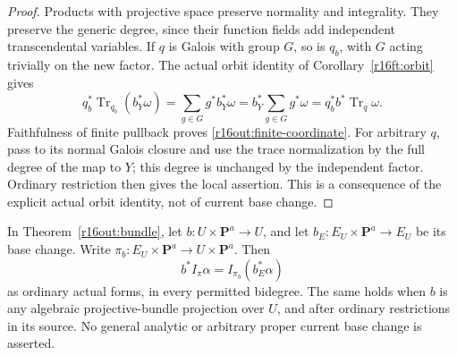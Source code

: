 \begin{proof}
Products with projective space preserve normality and integrality.
They preserve the generic degree, since their function fields add
independent transcendental variables.  If $q$ is Galois with group
$G$, so is $q_b$, with $G$ acting trivially on the new factor.
The actual orbit identity of Corollary~\ref{r16ft:orbit} gives
\[
 q_b^*\operatorname{Tr}_{q_b}(b_Y^*\omega)
  =\sum_{g\in G}g^*b_Y^*\omega
  =b_Y^*\sum_{g\in G}g^*\omega
  =q_b^*b^*\operatorname{Tr}_q\omega.
\]
Faithfulness of finite pullback proves \eqref{r16out:finite-coordinate}.
For arbitrary $q$, pass to its normal Galois closure and use the
trace normalization by the full degree of the map to $Y$; this
degree is unchanged by the independent factor.  Ordinary restriction
then gives the local assertion.  This is a consequence of the
explicit actual orbit identity, not of current base change.
\end{proof}

\begin{theorem}
\label{r16out:coordinate-base-change}
In Theorem~\ref{r16out:bundle}, let
$b:U\times\mathbf P^a\to U$, and let
$b_E:E_U\times\mathbf P^a\to E_U$ be its base change.  Write
$\pi_b:E_U\times\mathbf P^a\to U\times\mathbf P^a$.  Then
\[
 b^*I_\pi\alpha=I_{\pi_b}(b_E^*\alpha)
 \tag{OUT16.16}\label{r16out:coordinate-base-change-formula}
\]
as ordinary actual forms, in every permitted bidegree.  The same
holds when $b$ is any algebraic projective-bundle projection over
$U$, and after ordinary restrictions in its source.  No general
analytic or arbitrary proper current base change is asserted.
\end{theorem}

